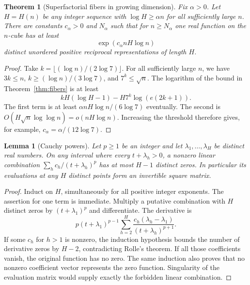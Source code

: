 \documentclass[11pt]{article}
\newtheorem{theorem}{Theorem}
\newtheorem{lemma}{Lemma}
\begin{document}
\begin{theorem}[Superfactorial fibers in growing dimension]
Fix $\alpha>0$. Let $H=H(n)$ be any integer sequence with
$\log H\geq\alpha n$ for all sufficiently large $n$. There are
constants $c_\alpha>0$ and $N_\alpha$ such that for $n\geq N_\alpha$
one real function on the $n$-cube has at least
\[
 \exp(c_\alpha n H\log n)
\]
distinct unordered positive reciprocal representations of length $H$.
\end{theorem}
\begin{proof}
Take $k=\lfloor(\log n)/(2\log7)\rfloor$. For all sufficiently
large $n$, we have $3k\leq n$, $k\geq(\log n)/(3\log7)$, and
$7^k\leq\sqrt n$. The logarithm of the bound in
Theorem~\ref{thm:fibers} is at least
\[
 kH(\log H-1)-H7^k\log(e(2k+1)).
\]
The first term is at least
$\alpha nH\log n/(6\log7)$ eventually. The second is
$O(H\sqrt n\log\log n)=o(nH\log n)$. Increasing the threshold
therefore gives, for example,
$c_\alpha=\alpha/(12\log7)$.
\end{proof}

\begin{lemma}[Cauchy powers]\label{lem:cauchy}
Let $p\geq1$ be an integer and let $\lambda_1,\ldots,\lambda_H$
be distinct real numbers. On any interval where every
$t+\lambda_h>0$, a nonzero linear combination
$\sum_h c_h/(t+\lambda_h)^p$ has at most $H-1$ distinct zeros.
In particular its evaluations at any $H$ distinct points form an
invertible square matrix.
\end{lemma}
\begin{proof}
Induct on $H$, simultaneously for all positive integer exponents.
The assertion for one term is immediate. Multiply a putative
combination with $H$ distinct zeros by $(t+\lambda_1)^p$ and
differentiate. The derivative is
\[
 p(t+\lambda_1)^{p-1}
       \sum_{h=2}^H
       \frac{c_h(\lambda_h-\lambda_1)}{(t+\lambda_h)^{p+1}}.
\]
If some $c_h$ for $h>1$ is nonzero, the induction hypothesis bounds
the number of derivative zeros by $H-2$, contradicting Rolle's
theorem. If all those coefficients vanish, the original function
has no zero. The same induction also proves that no nonzero
coefficient vector represents the zero function. Singularity of
the evaluation matrix would supply exactly the forbidden linear
combination.
\end{proof}
\end{document}
